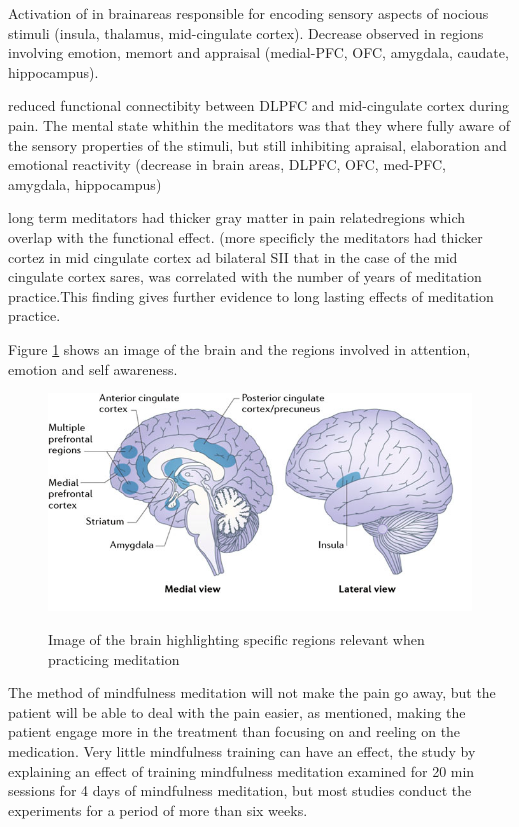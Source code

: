 Activation of in brainareas responsible for encoding sensory aspects of nocious stimuli (insula, thalamus, mid-cingulate cortex). Decrease observed in regions involving emotion, memort and appraisal (medial-PFC, OFC, amygdala, caudate, hippocampus).

reduced functional connectibity between DLPFC and mid-cingulate cortex during pain. The mental state whithin the meditators was that they where fully aware of the sensory properties of the stimuli, but still inhibiting apraisal, elaboration and emotional reactivity (decrease in brain areas, DLPFC, OFC, med-PFC, amygdala, hippocampus) 

long term meditators had thicker gray matter in pain relatedregions which overlap with the functional effect. (more specificly the meditators had thicker cortez in mid cingulate cortex ad bilateral SII that in the case of the mid cingulate cortex sares, was correlated with the number of years of meditation practice.This finding gives further evidence to long lasting effects of meditation practice. 

Figure \ref{fig:brain_meditation} shows an image of the brain and the regions involved in attention, emotion and self awareness. 

\begin{figure}[H]
	\includegraphics[width=1\textwidth]{figures/brain_meditation.png} 
	\caption{Image of the brain highlighting specific regions relevant when practicing meditation}
	\label{fig:brain_meditation}  
	\cite{Tang2017}
\end{figure}   

The method of mindfulness meditation will not make the pain go away, but the patient will be able to deal with the pain easier, as mentioned, making the patient engage more in the treatment than focusing on and reeling on the medication. \cite{Jacob2016}
Very little mindfulness training can have an effect, the study by \cite{Zeidan2012} explaining an effect of training mindfulness meditation examined for 20 min sessions for 4 days of mindfulness meditation, but most studies conduct the experiments for a period of more than six weeks. \cite{Zeidan2012}
